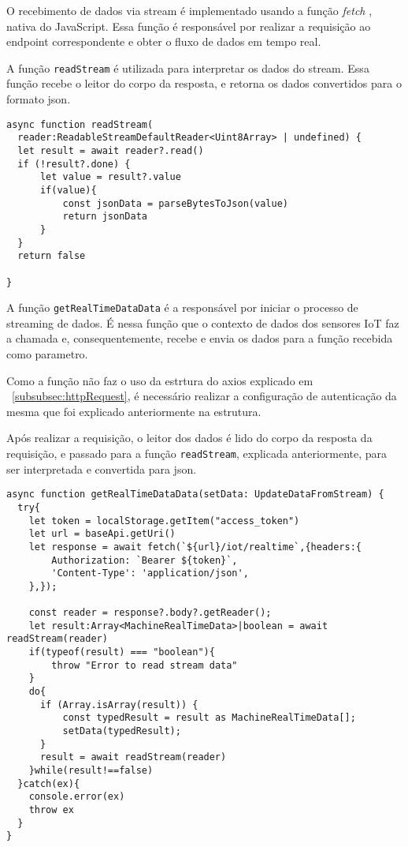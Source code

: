O recebimento de dados via stream é implementado usando a função \textit{fetch} \cite{mdnFetchAPI}, nativa do JavaScript. Essa função é responsável por realizar a requisição ao endpoint correspondente e obter o fluxo de dados em tempo real.

A função \texttt{readStream} é utilizada para interpretar os dados do stream. Essa função recebe o leitor do corpo da resposta, e retorna os dados convertidos para o formato \gls{json}.

\begin{verbatim}
async function readStream(
  reader:ReadableStreamDefaultReader<Uint8Array> | undefined) {
  let result = await reader?.read()
  if (!result?.done) {
      let value = result?.value
      if(value){
          const jsonData = parseBytesToJson(value)        
          return jsonData
      }
  }
  return false

}
\end{verbatim}

A função \texttt{getRealTimeDataData} é a responsável por iniciar o processo de streaming de dados. É nessa função que o contexto de dados dos sensores IoT faz a chamada e, consequentemente, recebe e envia os dados para a função recebida como parametro.

Como a função não faz o uso da estrtura do axios explicado em ~\ref{subsubsec:httpRequest}, é necessário realizar a configuração de autenticação da mesma que foi explicado anteriormente na estrutura.

Após realizar a requisição, o leitor dos dados é lido do corpo da resposta da requisição, e passado para a função \texttt{readStream}, explicada anteriormente, para ser interpretada e convertida para \gls{json}.

\begin{verbatim}
async function getRealTimeDataData(setData: UpdateDataFromStream) {
  try{
    let token = localStorage.getItem("access_token")
    let url = baseApi.getUri()
    let response = await fetch(`${url}/iot/realtime`,{headers:{
        Authorization: `Bearer ${token}`,
        'Content-Type': 'application/json',
    },});

    const reader = response?.body?.getReader();
    let result:Array<MachineRealTimeData>|boolean = await readStream(reader)
    if(typeof(result) === "boolean"){
        throw "Error to read stream data"
    }
    do{
      if (Array.isArray(result)) {
          const typedResult = result as MachineRealTimeData[];
          setData(typedResult);
      }
      result = await readStream(reader)
    }while(result!==false)
  }catch(ex){
    console.error(ex)
    throw ex
  }
}
\end{verbatim}

